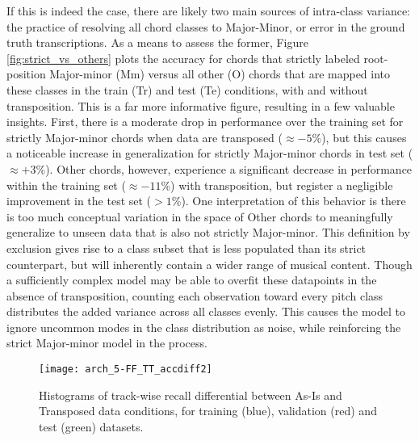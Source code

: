 If this is indeed the case, there are likely two main sources of intra-class variance: the practice of resolving all chord classes to Major-Minor, or error in the ground truth transcriptions.
As a means to assess the former, Figure \ref{fig:strict_vs_others} plots the accuracy for chords that strictly labeled root-position Major-minor (Mm) versus all other (O) chords that are mapped into these classes in the train (Tr) and test (Te) conditions, with and without transposition.
This is a far more informative figure, resulting in a few valuable insights.
First, there is a moderate drop in performance over the training set for strictly Major-minor chords when data are transposed ($\approx -5\%$), but this causes a noticeable increase in generalization for strictly Major-minor chords in test set ($\approx +3\%$).
Other chords, however, experience a significant decrease in performance within the training set ($\approx -11\%$) with transposition, but register a negligible improvement in the test set ($>1\%$).
One interpretation of this behavior is there is too much conceptual variation in the space of Other chords to meaningfully generalize to unseen data that is also not strictly Major-minor.
This definition by exclusion gives rise to a class subset that is less populated than its strict counterpart, but will inherently contain a wider range of musical content.
Though a sufficiently complex model may be able to overfit these datapoints in the absence of transposition, counting each observation toward every pitch class distributes the added variance across all classes evenly.
This causes the model to ignore uncommon modes in the class distribution as noise, while reinforcing the strict Major-minor model in the process.

\begin{figure}[!t]
\centering
\texttt{[image: arch\_5-FF\_TT\_accdiff2]}
\caption{Histograms of track-wise recall differential between As-Is and Transposed data conditions, for training (blue), validation (red) and test (green) datasets.}
\label{fig:acc_diff}
\end{figure}

